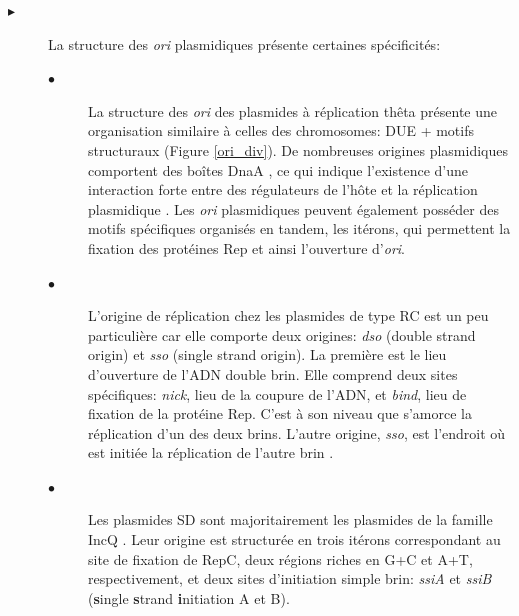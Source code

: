 \begin{description}
\item[$\blacktriangleright$] La structure des \textit{ori} plasmidiques présente certaines spécificités:
	\begin{description}
	\item[$\bullet$] La structure des \textit{ori} des plasmides à réplication thêta présente une organisation similaire à celles des chromosomes: DUE + motifs structuraux (Figure \ref{ori_div}). De nombreuses origines plasmidiques comportent des boîtes DnaA \citep{rajewska2012rich}, ce qui indique l'existence d'une interaction forte entre des régulateurs de l'hôte et la réplication plasmidique \citep{Kruger2004}. Les \textit{ori} plasmidiques peuvent également posséder des motifs spécifiques organisés en tandem, les itérons, qui permettent la fixation des protéines Rep et ainsi l'ouverture d'\textit{ori}. 
	\item[$\bullet$] L'origine de réplication chez les plasmides de type RC est un peu particulière car elle comporte deux origines: \textit{dso} (double strand origin) et \textit{sso} (single strand origin). La première est le lieu d'ouverture de l'ADN double brin. Elle comprend deux sites spécifiques: \textit{nick}, lieu de la coupure de l'ADN, et \textit{bind}, lieu de fixation de la protéine Rep. C'est à son niveau que s'amorce la réplication d'un des deux brins. L'autre origine, \textit{sso}, est l'endroit où est initiée la réplication de l'autre brin \citep{khan2005plasmid}. 
	\item[$\bullet$] Les plasmides SD sont majoritairement les plasmides de la famille IncQ \citep{Loftie-Eaton2012}. Leur origine est structurée en trois itérons correspondant au site de fixation de RepC, deux régions riches en G+C et A+T, respectivement, et deux sites d'initiation simple brin: \textit{ssiA} et \textit{ssiB} (\textbf{s}ingle \textbf{s}trand \textbf{i}nitiation A et B).
	\end{description}
\end{description}
  
